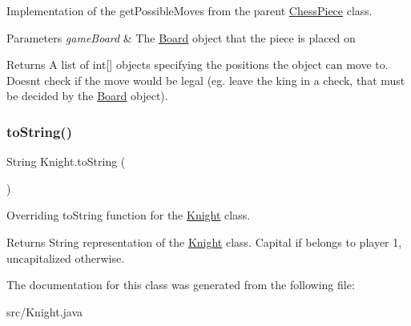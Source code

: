Implementation of the get\+Possible\+Moves from the parent \mbox{\hyperlink{class_chess_piece}{Chess\+Piece}} class. 
\begin{DoxyParams}{Parameters}
{\em game\+Board} & The \mbox{\hyperlink{class_board}{Board}} object that the piece is placed on \\
\hline
\end{DoxyParams}
\begin{DoxyReturn}{Returns}
A list of int\mbox{[}\mbox{]} objects specifying the positions the object can move to. Doesn\textquotesingle{}t check if the move would be legal (eg. leave the king in a check, that must be decided by the \mbox{\hyperlink{class_board}{Board}} object). 
\end{DoxyReturn}
\mbox{\label{class_knight_a6b3796f80d286950a50b293e7972124b}} 
\subsubsection{\texorpdfstring{to\+String()}{toString()}}
{\footnotesize\ttfamily String Knight.\+to\+String (\begin{DoxyParamCaption}{ }\end{DoxyParamCaption})}

Overriding to\+String function for the \mbox{\hyperlink{class_knight}{Knight}} class. \begin{DoxyReturn}{Returns}
String representation of the \mbox{\hyperlink{class_knight}{Knight}} class. Capital if belongs to player 1, uncapitalized otherwise. 
\end{DoxyReturn}


The documentation for this class was generated from the following file\+:\begin{DoxyCompactItemize}
\item 
src/Knight.\+java\end{DoxyCompactItemize}
